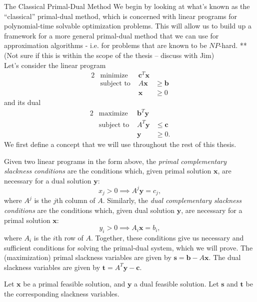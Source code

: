 \documentclass[11pt]{article}
\renewcommand{\'}{^{'}}
\newenvironment{theorem}[2][Theorem]{\begin{trivlist}
\item[\hskip \labelsep {\bfseries #1}\hskip \labelsep {\bfseries #2.}]}{\end{trivlist}}
\newenvironment{definition}[2][Definition]{\begin{trivlist}
\item[\hskip \labelsep {\bfseries #1}\hskip \labelsep {\bfseries #2.}]}{\end{trivlist}}
\begin{document}
\begin{section}{The Classical Primal-Dual Method}
	We begin by looking at what's known as the ``classical'' primal-dual method, which is concerned 
	with linear programs for polynomial-time solvable optimization problems. This will allow us 
	to build up a framework for a more general primal-dual method that we can use for approximation 
	algorithms - i.e. for problems that are known to be $NP$-hard. **(Not sure if this is within the 
	scope of the thesis -- discuss with Jim)\\
	Let's consider the linear program
	\begin{alignat}{2}
		& \text{minimize} & \mathbf{c}^{T}\mathbf{x} \\
		& \text{subject to } & A\mathbf{x} & \geq \mathbf{b} \\
		&& \mathbf{x} & \geq 0
	\end{alignat}
	and its dual
	\begin{alignat}{2}
		& \text{maximize} & \mathbf{b}^{T}\mathbf{y} \\
		& \text{subject to } & A^{T}\mathbf{y} & \leq \mathbf{c} \\
		&& \mathbf{y} & \geq 0.
	\end{alignat}
	We first define a concept that we will use throughout the rest of this thesis. 
	\begin{definition}{(Complementary slackness)}
		Given two linear programs in the form above, the \emph{primal complementary slackness 
		conditions} are the conditions which, given primal solution $\mathbf{x}$, 
		are necessary for a dual solution $\mathbf{y}$:
		\[
			x_j > 0 \implies A^{j}\mathbf{y} = c_j,
		\]
		where $A^{j}$ is the $j$th column of $A$. Similarly, the \emph{dual complementary 
		slackness conditions} are the conditions which, given dual solution $\mathbf{y}$, are 
		necessary for a primal solution $\mathbf{x}$:
		\[
			y_i > 0 \implies A_i\mathbf{x} = b_i,
		\]
		where $A_i$ is the $i$th row of $A$. Together, these conditions give us necessary and 
		sufficient conditions for solving the primal-dual system, which we will prove. The 
		(maximization) primal slackness variables are given by 
		$\mathbf{s} = \mathbf{b} - A\mathbf{x}$. The dual slackness variables are given by 
		$\mathbf{t} = A^{T}\mathbf{y} - \mathbf{c}$.
	\end{definition}
	\begin{theorem}{}
		[CITE THIS THEOREM]
		Let $\mathbf{x}$ be a primal feasible solution, and $\mathbf{y}$ a dual feasible 
		solution. Let $\mathbf{s}$ and $\mathbf{t}$ be the corresponding slackness variables. 

\end{theorem}
\end{section}
\end{document}
